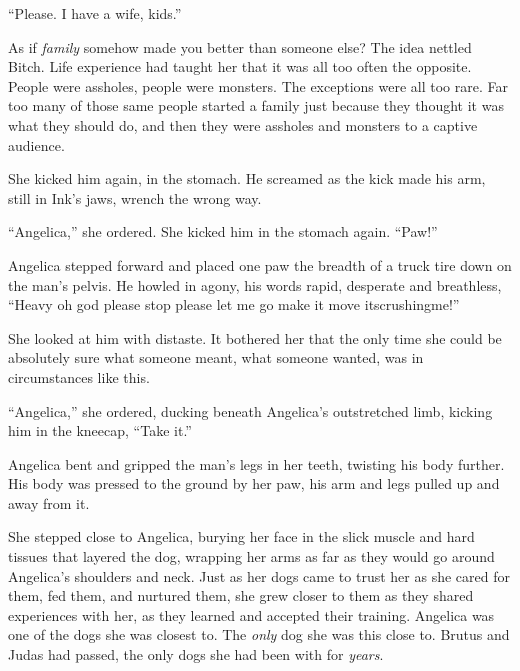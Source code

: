 ``Please.  I have a wife, kids.''



As if \emph{famil}\emph{y} somehow made you better than someone else?  The idea nettled Bitch.  Life experience had taught her that it was all too often the opposite.  People were assholes, people were monsters.  The exceptions were all too rare.  Far too many of those same people started a family just because they thought it was what they should do, and then they were assholes and monsters to a captive audience.



She kicked him again, in the stomach.  He screamed as the kick made his arm, still in Ink's jaws, wrench the wrong way.



``Angelica,'' she ordered.  She kicked him in the stomach again.  ``Paw!''



Angelica stepped forward and placed one paw the breadth of a truck tire down on the man's pelvis.  He howled in agony, his words rapid, desperate and breathless, ``Heavy oh god please stop please let me go make it move itscrushingme!''



She looked at him with distaste.  It bothered her that the only time she could be absolutely sure what someone meant, what someone wanted, was in circumstances like this.



``Angelica,'' she ordered, ducking beneath Angelica's outstretched limb, kicking him in the kneecap, ``Take it.''



Angelica bent and gripped the man's legs in her teeth, twisting his body further.  His body was pressed to the ground by her paw, his arm and legs pulled up and away from it.



She stepped close to Angelica, burying her face in the slick muscle and hard tissues that layered the dog, wrapping her arms as far as they would go around Angelica's shoulders and neck.  Just as her dogs came to trust her as she cared for them, fed them, and nurtured them, she grew closer to them as they shared experiences with her, as they learned and accepted their training.  Angelica was one of the dogs she was closest to.  The \emph{only} dog she was this close to.  Brutus and Judas had passed, the only dogs she had been with for \emph{years}.



